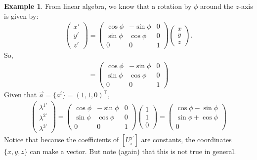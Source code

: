 \documentclass{book}
\theoremstyle{definition}
\newtheorem{exmp}{Example}[section]
\begin{document}
\begin{exmp}
	From linear algebra, we know that a rotation by $\phi$ around the $z$-axis is given by:
	\begin{align*}
	\begin{pmatrix}
	x'\\y'\\z'
	\end{pmatrix}
	=
	\begin{pmatrix}
	\cos\phi & -\sin\phi & 0\\
	\sin\phi & \cos\phi & 0 \\
	0 & 0 & 1
	\end{pmatrix}
	\begin{pmatrix}
	x\\y\\z
	\end{pmatrix}.
	\end{align*}
	So,
	\begin{align*}
	[U^{j'}_i] = 
	\begin{pmatrix}
	\cos\phi & -\sin\phi & 0\\
	\sin\phi & \cos\phi & 0 \\
	0 & 0 & 1
	\end{pmatrix}
	\end{align*}
	Given that $\vec{a} = \{a^i \}= (1,1,0)^\top$, 
	\begin{align*}
	\begin{pmatrix}
	\lambda^{1'}\\\lambda^{2'}\\\lambda^{3'}
	\end{pmatrix}
	=
	\begin{pmatrix}
	\cos\phi & -\sin\phi & 0\\
	\sin\phi & \cos\phi & 0 \\
	0 & 0 & 1
	\end{pmatrix}
	\begin{pmatrix}
	1\\1\\0
	\end{pmatrix}
	=
	\begin{pmatrix}
		\cos\phi - \sin\phi\\
		\sin\phi + \cos\phi\\
		0
	\end{pmatrix}
	\end{align*}
	Notice that because the coefficients of $[U^{j'}_i]$ are constants, the coordinates $\{ x,y,z\}$ can make a vector. But note (again) that this is not true in general.\\
	

\end{exmp}
\end{document}
